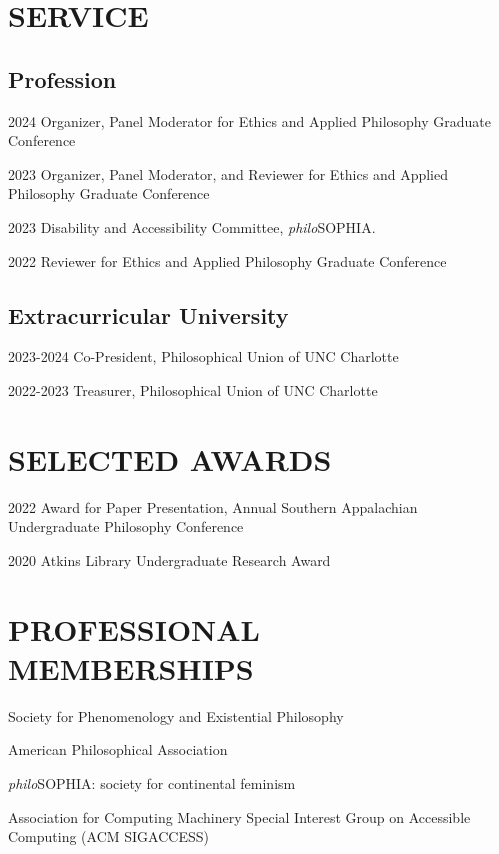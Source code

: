 \documentclass{article}
\newcommand{\listitemspace}{0.25em}
\renewenvironment{itemize}
{\begin{list}{}{\setlength{\leftmargin}{0em}
                \setlength{\parskip}{0em}
                \setlength{\itemsep}{\listitemspace}
                \setlength{\parsep}{\listitemspace}}}
{\end{list}}
\begin{document}
\section*{\normalsize{\MakeUppercase{Service}}}
\subsection*{\normalsize{Profession}}
\begin{tablist}
    \item[2024] \tab{}Organizer, Panel Moderator for Ethics and Applied Philosophy Graduate Conference
    \item[2023] \tab{}Organizer, Panel Moderator, and Reviewer for Ethics and Applied Philosophy Graduate Conference
    \item[2023] \tab{}Disability and Accessibility Committee, \textit{philo}SOPHIA.
    \item[2022] \tab{}Reviewer for Ethics and Applied Philosophy Graduate Conference
\end{tablist}
\subsection*{\normalsize{Extracurricular University}}
\begin{tablist}
    \item[2023-2024] \tab{}Co-President, Philosophical Union of UNC Charlotte
    \item[2022-2023] \tab{}Treasurer, Philosophical Union of UNC Charlotte
\end{tablist}

\section*{\normalsize{\MakeUppercase{Selected Awards}}}
\begin{tablist}
    \item[2022] \tab{}Award for Paper Presentation,  Annual Southern Appalachian Undergraduate Philosophy Conference
    \item[2020] \tab{}Atkins Library Undergraduate Research Award
\end{tablist}

\section*{\normalsize{\MakeUppercase{Professional Memberships}}}
\begin{itemize}
    \item Society for Phenomenology and Existential Philosophy
    \item American Philosophical Association
    \item \textit{philo}SOPHIA: society for continental feminism
    \item Association for Computing Machinery \textemdash{} Special Interest Group on Accessible Computing (ACM SIGACCESS)
\end{itemize}
\end{document}
